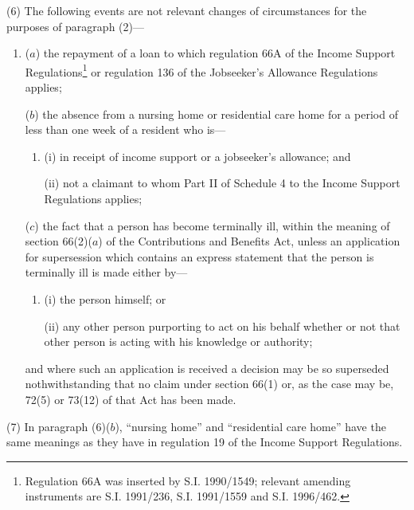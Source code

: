 \documentclass[12pt,a4paper]{article}
\begin{document}
(6) The following events are not relevant changes of circumstances for the purposes of paragraph (2)—
\begin{enumerate}\item[]
($a$) the repayment of a loan to which regulation 66A of the Income Support Regulations\footnote{\frenchspacing Regulation 66A was inserted by S.I. 1990/1549; relevant amending instruments are S.I. 1991/236, S.I. 1991/1559 and S.I. 1996/462.} or regulation 136 of the Jobseeker’s Allowance Regulations applies;

($b$) the absence from a nursing home or residential care home for a period of less than one week of a resident who is—
\begin{enumerate}\item[]
(i) in receipt of income support or a jobseeker’s allowance; and

(ii) not a claimant to whom Part II of Schedule 4 to the Income Support Regulations applies;
\end{enumerate}

($c$) the fact that a person has become terminally ill, within the meaning of section 66(2)($a$) of the Contributions and Benefits Act, unless an application for supersession which contains an express statement that the person is terminally ill is made either by—
\begin{enumerate}\item[]
(i) the person himself; or

(ii) any other person purporting to act on his behalf whether or not that other person is acting with his knowledge or authority;
\end{enumerate}
and where such an application is received a decision may be so superseded nothwithstanding that no claim under section 66(1) or, as the case may be, 72(5) or 73(12) of that Act has been made.
\end{enumerate}

(7) In paragraph (6)($b$), “nursing home” and “residential care home” have the same meanings as they have in regulation 19 of the Income Support Regulations.

\end{document}
